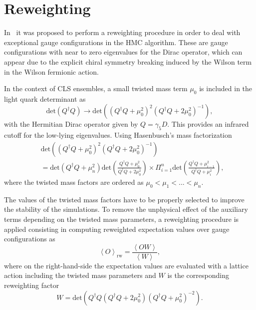 \section{Reweighting}

In~\citep{Luscher:2008tw} it was proposed to perform a reweighting procedure in order to deal with exceptional gauge configurations in the HMC algorithm. These are gauge configurations with near to zero eigenvalues for the Dirac operator, which can appear due to the explicit chiral symmetry breaking induced by the Wilson term in the Wilson fermionic action.

In the context of CLS ensembles, a small twisted mass term $\mu_0$ is included in the light quark determinant as~\citep{Luscher:2012av}
\begin{equation}
\textrm{det}\left(Q^{\dagger}Q\right)\rightarrow\textrm{det}\left(\left(Q^{\dagger}Q+\mu_0^2\right)^2\left(Q^{\dagger}Q+2\mu_0^2\right)^{-1}\right),
\end{equation}
with the Hermitian Dirac operator given by $Q=\gamma_5D$. This provides an infrared cutoff for the low-lying eigenvalues. Using Hasenbusch’s mass factorization~\citep{Hasenbusch:2001ne}
\begin{align}
&\textrm{det}\left(\left(Q^{\dagger}Q+\mu_0^2\right)^2\left(Q^{\dagger}Q+2\mu_0^2\right)^{-1}\right) \\ 
&=\textrm{det}\left(Q^{\dagger}Q+\mu_{n}^2\right)\textrm{det}\left(\frac{Q^{\dagger}Q+\mu_{0}^2}{Q^{\dagger}Q+2\mu_0^2}\right)\times\Pi_{i=1}^{n}\textrm{det}\left(\frac{Q^{\dagger}Q+\mu_{i-1}^2}{Q^{\dagger}Q+\mu_i^2}\right),
\end{align}
where the twisted mass factors are ordered as $\mu_0<\mu_1<...<\mu_{n}$. 

The values of the twisted mass factors have to be properly selected to improve the stability of the simulations. To remove the unphysical effect of the auxiliary terms depending on the twisted mass parameters, a reweighting  procedure is applied consisting in computing reweighted expectation values over gauge configurations as
\begin{equation}
\left<O\right>_{\textrm{rw}}=\frac{\left<OW\right>}{\left<W\right>},
\end{equation}
where on the right-hand-side the expectation values are evaluated with a lattice action including the twisted mass parameters and $W$ is the corresponding reweighting factor
\begin{equation}
W=\textrm{det}\left(Q^{\dagger}Q\left(Q^{\dagger}Q+2\mu_0^2\right)\left(Q^{\dagger}Q+\mu_0^2\right)^{-2}\right).
\end{equation}

